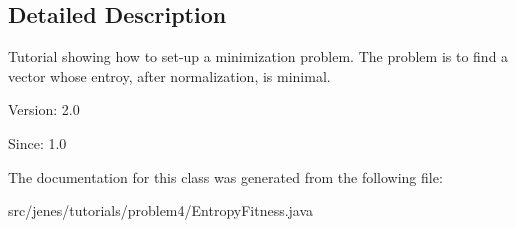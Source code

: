 \subsection{Detailed Description}
Tutorial showing how to set-up a minimization problem. The problem is to find a vector whose entroy, after normalization, is minimal.

\begin{Desc}
\item[Version:]2.0 \end{Desc}
\begin{Desc}
\item[Since:]1.0 \end{Desc}


The documentation for this class was generated from the following file:\begin{CompactItemize}
\item 
src/jenes/tutorials/problem4/EntropyFitness.java\end{CompactItemize}
